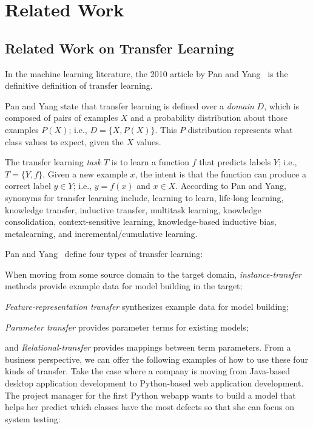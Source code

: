 \section{Related Work}
\subsection{Related Work on Transfer Learning}
In the machine learning literature, the 2010 article by
Pan and Yang~\cite{Pan10} is the definitive definition of
transfer learning.

Pan and Yang state that transfer learning is defined over a {\em domain} $D$,
which is composed of pairs of
examples $X$ and a probability distribution about those examples $P(X)$;
i.e., \mbox{$D = \{ X, P(X) \}$}.
This $P$ distribution represents what class values to expect, given the $X$ values.


The transfer learning {\em task} $T$ is to learn a function $f$ that predicts labels $Y$; i.e.,
$T = \{ Y, f \}$.
Given a new example $x$, the intent is that the function can produce a correct
label $y\in Y$; i.e., $y = f(x)$ and $x\in X$.
According to Pan and Yang, synonyms for transfer learning include, learning
to learn, life-long learning, knowledge transfer, inductive transfer,
multitask learning, knowledge consolidation, context-sensitive
learning, knowledge-based inductive bias, metalearning, and
incremental/cumulative learning.

Pan and Yang~\cite{Pan10} define four types of transfer learning:
\squishlist
\item
When moving from some source domain    to the target domain,   {\em instance-transfer} methods
provide example data for model building in the target;
\item
{\em Feature-representation transfer} synthesizes example data for
model building;
\item
{\em Parameter transfer} provides parameter terms for existing models;
\item
and {\em Relational-transfer} provides mappings between term parameters.
\squishend
From a business perspective, we can offer the following examples of
how to use these four kinds of transfer. Take the case where a company
is moving from Java-based desktop application development to
Python-based web application development. The project manager for the
first Python webapp wants to build a model that helps her predict
which classes have the most defects so that she can focus on system
testing:

